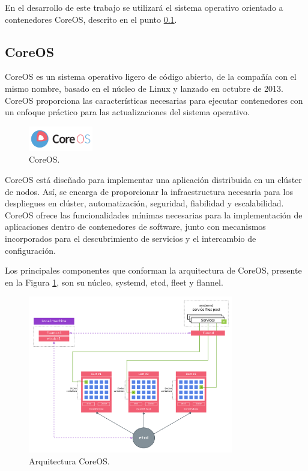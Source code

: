 En el desarrollo de este trabajo se utilizará el sistema operativo orientado a contenedores CoreOS, descrito en el punto \ref{CoreOS}.

\subsection{CoreOS}\label{CoreOS}

CoreOS es un sistema operativo ligero de código abierto, de la compañía con el mismo nombre, basado en el núcleo de Linux y lanzado en octubre de 2013. CoreOS proporciona las características necesarias para ejecutar contenedores con un enfoque práctico para las actualizaciones del sistema operativo.

\begin{figure}[H]
\centering
\includegraphics[width=0.25\textwidth]{images/figures/coreos.png}
\caption{CoreOS.\footnotemark}
\end{figure}


CoreOS está diseñado para implementar una aplicación distribuida en un clúster de nodos. Así, se encarga de proporcionar la infraestructura necesaria para los despliegues en clúster, automatización, seguridad, fiabilidad y escalabilidad. CoreOS ofrece las funcionalidades mínimas necesarias para la implementación de aplicaciones dentro de contenedores de software, junto con mecanismos incorporados para el descubrimiento de servicios y el intercambio de configuración.

Los principales componentes que conforman la arquitectura de CoreOS, presente en la Figura \ref{fig:CoreOSarchitecture}, son su núcleo, systemd\cite{coreossystemd}, etcd\cite{etcd}, fleet\cite{fleet} y flannel\cite{flannel}.

\begin{figure}[H]
\centering
\includegraphics[width=0.8\textwidth]{images/figures/coreosarchitecture.png}
\caption{Arquitectura CoreOS.\footnotemark \label{fig:CoreOSarchitecture}}
\end{figure}

